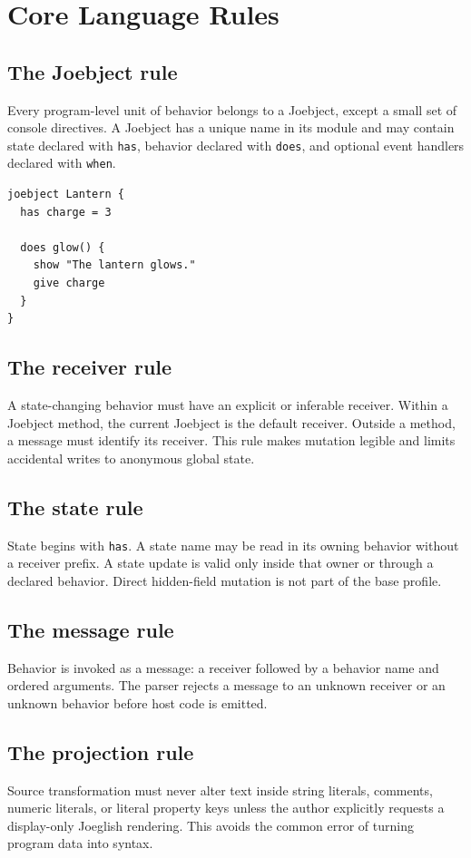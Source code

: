 \documentclass[12pt]{article}
\begin{document}
\clearpage
\section{Core Language Rules}
\subsection{The Joebject rule}
Every program-level unit of behavior belongs to a Joebject, except a small set of console directives. A Joebject has a unique name in its module and may contain state declared with \texttt{has}, behavior declared with \texttt{does}, and optional event handlers declared with \texttt{when}.

\begin{lstlisting}[style=joe]
joebject Lantern {
  has charge = 3

  does glow() {
    show "The lantern glows."
    give charge
  }
}
\end{lstlisting}

\subsection{The receiver rule}
A state-changing behavior must have an explicit or inferable receiver. Within a Joebject method, the current Joebject is the default receiver. Outside a method, a message must identify its receiver. This rule makes mutation legible and limits accidental writes to anonymous global state.

\subsection{The state rule}
State begins with \texttt{has}. A state name may be read in its owning behavior without a receiver prefix. A state update is valid only inside that owner or through a declared behavior. Direct hidden-field mutation is not part of the base profile.

\subsection{The message rule}
Behavior is invoked as a message: a receiver followed by a behavior name and ordered arguments. The parser rejects a message to an unknown receiver or an unknown behavior before host code is emitted.

\subsection{The projection rule}
Source transformation must never alter text inside string literals, comments, numeric literals, or literal property keys unless the author explicitly requests a display-only Joeglish rendering. This avoids the common error of turning program data into syntax.
\end{document}
